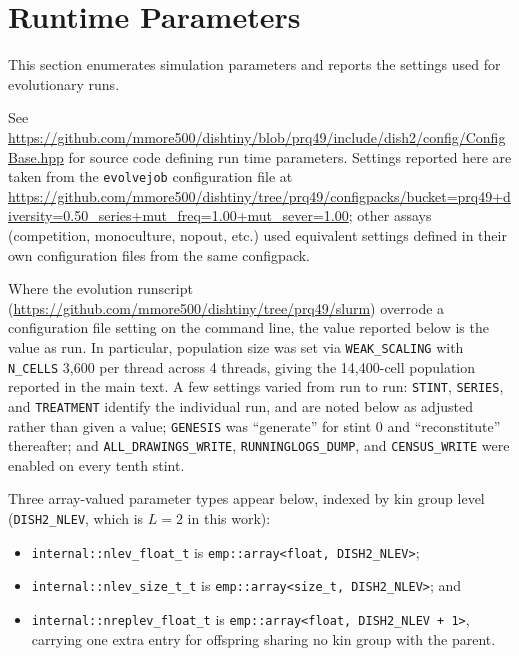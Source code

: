\section{Runtime Parameters}

\newcommand{\confdef}[2]{
    ~\\ \begin{tabular}{|
        >{\columncolor[HTML]{C0C0C0}}l |l|}
        \hline
        Type & \texttt{#1} \\ \hline
        Setting   & \texttt{#2} \\ \hline
    \end{tabular}
}

This section enumerates simulation parameters and reports the settings used for evolutionary runs.

See \url{https://github.com/mmore500/dishtiny/blob/prq49/include/dish2/config/ConfigBase.hpp} for source code defining run time parameters.
Settings reported here are taken from the \texttt{evolvejob} configuration file at \url{https://github.com/mmore500/dishtiny/tree/prq49/configpacks/bucket=prq49+diversity=0.50_series+mut_freq=1.00+mut_sever=1.00}; other assays (competition, monoculture, nopout, etc.) used equivalent settings defined in their own configuration files from the same configpack.

Where the evolution runscript (\url{https://github.com/mmore500/dishtiny/tree/prq49/slurm}) overrode a configuration file setting on the command line, the value reported below is the value as run.
In particular, population size was set via \texttt{WEAK\_SCALING} with \texttt{N\_CELLS} 3,600 per thread across 4 threads, giving the 14,400-cell population reported in the main text.
A few settings varied from run to run: \texttt{STINT}, \texttt{SERIES}, and \texttt{TREATMENT} identify the individual run, and are noted below as adjusted rather than given a value; \texttt{GENESIS} was ``generate'' for stint 0 and ``reconstitute'' thereafter; and \texttt{ALL\_DRAWINGS\_WRITE}, \texttt{RUNNINGLOGS\_DUMP}, and \texttt{CENSUS\_WRITE} were enabled on every tenth stint.

Three array-valued parameter types appear below, indexed by kin group level (\texttt{DISH2\_NLEV}, which is $L=2$ in this work):
\begin{itemize}
\item \texttt{internal::nlev\_float\_t} is \texttt{emp::array<float, DISH2\_NLEV>};
\item \texttt{internal::nlev\_size\_t\_t} is \texttt{emp::array<size\_t, DISH2\_NLEV>}; and
\item \texttt{internal::nreplev\_float\_t} is \texttt{emp::array<float, DISH2\_NLEV + 1>}, carrying one extra entry for offspring sharing no kin group with the parent.
\end{itemize}

